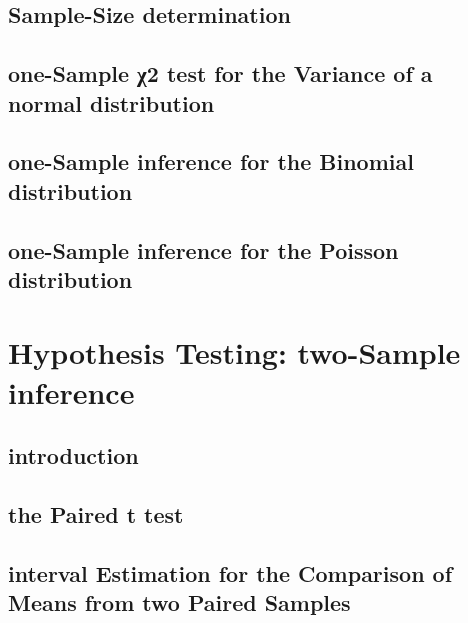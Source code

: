 \documentclass[12pt,]{article}
\begin{document}
\hypertarget{sample-size-determination}{%
\subsection{Sample-Size determination}\label{sample-size-determination}}

\hypertarget{one-sample-2-test-for-the-variance-of-a-normal-distribution}{%
\subsection{one-Sample χ2 test for the Variance of a normal
distribution}\label{one-sample-2-test-for-the-variance-of-a-normal-distribution}}

\hypertarget{one-sample-inference-for-the-binomial-distribution}{%
\subsection{one-Sample inference for the Binomial
distribution}\label{one-sample-inference-for-the-binomial-distribution}}

\hypertarget{one-sample-inference-for-the-poisson-distribution}{%
\subsection{one-Sample inference for the Poisson
distribution}\label{one-sample-inference-for-the-poisson-distribution}}

\hypertarget{hypothesis-testing-two-sample-inference}{%
\section{Hypothesis Testing: two-Sample
inference}\label{hypothesis-testing-two-sample-inference}}

\hypertarget{introduction-4}{%
\subsection{introduction}\label{introduction-4}}

\hypertarget{the-paired-t-test}{%
\subsection{the Paired t test}\label{the-paired-t-test}}

\hypertarget{interval-estimation-for-the-comparison-of-means-from-two-paired-samples}{%
\subsection{interval Estimation for the Comparison of Means from two
Paired
Samples}\label{interval-estimation-for-the-comparison-of-means-from-two-paired-samples}}
\end{document}
